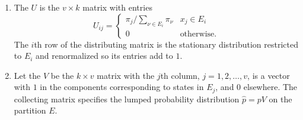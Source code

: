\documentclass[12pt]{article}
\begin{document}
\begin{enumerate}
    \item
        The %
        \( U \) is the \( v \times k \) matrix with entries
        \[
            U_{ij} =
            \begin{cases}
                \pi_j/\sum_{\nu \in E_i} \pi_\nu & x_j \in E_i \\
                0 & \text{otherwise}.
            \end{cases}
        \] The \( i \)th row of the distributing matrix is the
        stationary distribution restricted to \( E_i \) and renormalized
        so its entries add to \( 1 \).
    \item
        Let the %
        \( V \) be the \( k \times v \) matrix with the \( j \)th
        column, \( j = 1, 2, \dots, v \), is a vector with \( 1 \) in
        the components corresponding to states in \( E_j \), and \( 0 \)
        elsewhere.  The collecting matrix specifies the lumped
        probability distribution \( \hat{p} = p V \) on the partition \(
        E \).
\end{enumerate}
\end{document}
